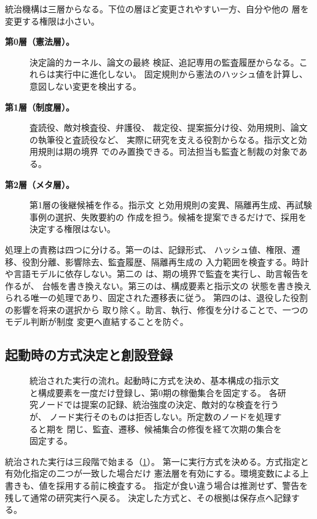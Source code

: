 統治機構は三層からなる。下位の層ほど変更されやすい一方、自分や他の
層を変更する権限は小さい。

\begin{description}
  \item[\textbf{第0層（憲法層）。}] 決定論的カーネル、論文の最終
        検証、追記専用の監査履歴からなる。これらは実行中に進化しない。
        固定規則から憲法のハッシュ値を計算し、意図しない変更を検出する。
  \item[\textbf{第1層（制度層）。}] 査読役、敵対検査役、弁護役、
        裁定役、提案振分け役、効用規則、論文の執筆役と査読役など、
        実際に研究を支える役割からなる。指示文と効用規則は期の境界
        でのみ置換できる。司法担当も監査と制裁の対象である。
  \item[\textbf{第2層（メタ層）。}] 第1層の後継候補を作る。指示文
        と効用規則の変異、隔離再生成、再試験事例の選択、失敗要約の
        作成を担う。候補を提案できるだけで、採用を決定する権限はない。
\end{description}

処理上の責務は四つに分ける。第一のは、記録形式、
ハッシュ値、権限、遷移、役割分離、影響除去、監査履歴、隔離再生成の
入力範囲を検査する。時計や言語モデルに依存しない。第二の
は、期の境界で監査を実行し、助言報告を作るが、
台帳を書き換えない。第三のは、構成要素と指示文の
状態を書き換えられる唯一の処理であり、固定された遷移表に従う。
第四のは、退役した役割の影響を将来の選択から
取り除く。助言、執行、修復を分けることで、一つのモデル判断が制度
変更へ直結することを防ぐ。

\subsection{起動時の方式決定と創設登録}\label{sec:rqgm:boot}

\begin{figure}[t]
  \centering
  \resizebox{\columnwidth}{!}{}
  \caption{統治された実行の流れ。起動時に方式を決め、基本構成の指示文
    と構成要素を一度だけ登録し、第0期の稼働集合を固定する。
    各研究ノードでは提案の記録、統治強度の決定、敵対的な検査を行うが、
    ノード実行そのものは拒否しない。所定数のノードを処理すると期を
    閉じ、監査、遷移、候補集合の修復を経て次期の集合を固定する。}
  \label{fig:rqgm-lifecycle}
\end{figure}

統治された実行は三段階で始まる（\cref{fig:rqgm-lifecycle}）。
第一に実行方式を決める。方式指定と有効化指定の二つが一致した場合だけ
憲法層を有効にする。環境変数による上書きも、値を採用する前に検査する。
指定が食い違う場合は推測せず、警告を残して通常の研究実行へ戻る。
決定した方式と、その根拠は保存点へ記録する。

